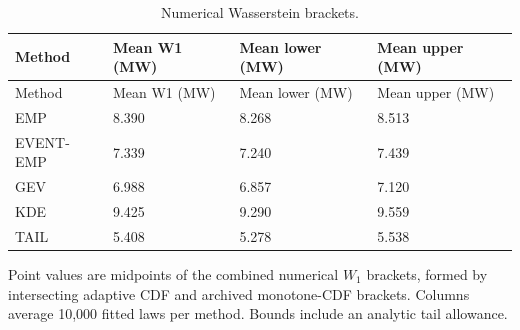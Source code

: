 \begingroup
\fontsize{8.5}{10.5}\selectfont\setlength{\tabcolsep}{3pt}
\begin{longtable}{@{}llll@{}}
\caption{Numerical Wasserstein brackets.}\label{tab:final-si-6}\\
\toprule
Method & Mean W1 (MW) & Mean lower (MW) & Mean upper (MW)\\\midrule\endfirsthead
Method & Mean W1 (MW) & Mean lower (MW) & Mean upper (MW)\\\midrule\endhead
EMP & 8.390 & 8.268 & 8.513\\
EVENT-EMP & 7.339 & 7.240 & 7.439\\
GEV & 6.988 & 6.857 & 7.120\\
KDE & 9.425 & 9.290 & 9.559\\
TAIL & 5.408 & 5.278 & 5.538\\
\bottomrule
\end{longtable}
\noindent\footnotesize Point values are midpoints of the combined numerical $W_1$ brackets, formed by intersecting adaptive CDF and archived monotone-CDF brackets. Columns average 10,000 fitted laws per method. Bounds include an analytic tail allowance.
\endgroup
